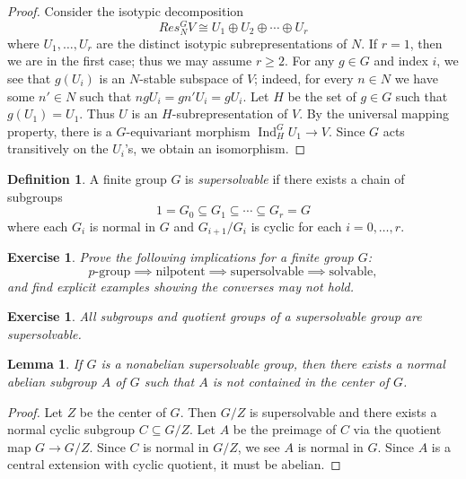 \documentclass[12pt]{article}
\theoremstyle{plain}
\newtheorem{lemma}[theorem]{Lemma}
\newtheorem{exercise}[theorem]{Exercise}
\theoremstyle{definition}
\newtheorem{definition}[theorem]{Definition}
\theoremstyle{remark}
\numberwithin{equation}{section}
\begin{document}
\begin{proof}
Consider the isotypic decomposition
\[
Res^G_N V \cong U_1 \oplus U_2 \oplus \cdots \oplus U_r
\]
where $U_1, \ldots, U_r$ are the distinct isotypic subrepresentations of $N$.
If $r=1$, then we are in the first case; thus we may assume $r \ge 2$.
For any $g \in G$ and index $i$, we see that $g(U_i)$ is an $N$-stable
subspace of $V$; indeed, for every $n\in N$ we have some $n' \in N$
such that $ngU_i=gn'U_i=gU_i$.
Let $H$ be the set of $g \in G$ such that $g(U_1)=U_1$.
Thus $U$ is an $H$-subrepresentation of $V$.
By the universal mapping property, there is a $G$-equivariant
morphism $\operatorname{Ind}^G_H U_1 \to V$.
Since $G$ acts transitively on the $U_i$'s, we obtain an isomorphism.
\end{proof}

\begin{definition}
A finite group $G$ is \emph{supersolvable} if there exists a chain of
subgroups
\[
1=G_0 \subseteq G_1 \subseteq \cdots \subseteq G_r = G
\]
where each $G_i$ is normal in $G$ and $G_{i+1}/G_i$ is cyclic
for each $i=0,\ldots, r$. 
\end{definition}

\begin{exercise}
Prove the following implications for a finite group $G$:
\[
\textrm{$p$-group} \implies
\textrm{nilpotent} \implies \textrm{supersolvable} \implies
\textrm{solvable},
\]
and find explicit examples showing the converses may not hold.
\end{exercise}

\begin{exercise}
All subgroups and quotient groups of a supersolvable group are
supersolvable.
\end{exercise}

\begin{lemma} \label{lem:ss_abel}
If $G$ is a nonabelian supersolvable group, then there exists a normal
abelian subgroup $A$ of $G$ such that $A$ is not contained in the center
of $G$.
\end{lemma}

\begin{proof}
Let $Z$ be the center of $G$.  Then $G/Z$ is supersolvable and there
exists a normal cyclic subgroup $C \subseteq G/Z$.  Let $A$ be the
preimage of $C$ via the quotient map $G \to G/Z$.
Since $C$ is normal in $G/Z$, we see $A$ is normal in $G$.
Since $A$ is a central extension with cyclic quotient, it must be
abelian.
\end{proof}
\end{document}
